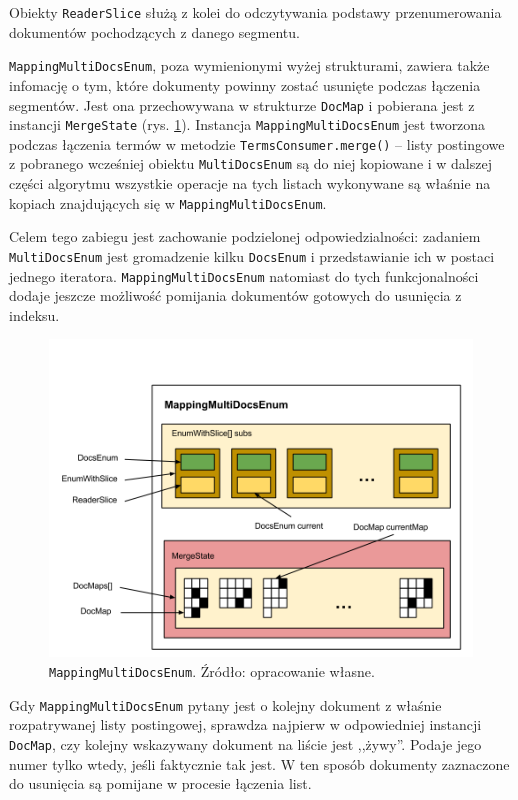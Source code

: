 Obiekty \texttt{ReaderSlice} służą z kolei do odczytywania podstawy przenumerowania dokumentów pochodzących z danego segmentu.

\texttt{MappingMultiDocsEnum}, poza wymienionymi wyżej strukturami, zawiera także infomację o tym, które dokumenty powinny zostać usunięte podczas łączenia segmentów. Jest ona przechowywana w strukturze \texttt{DocMap} i pobierana jest z instancji \texttt{MergeState} (rys. \ref{fig:mappingMultiDocsEnum}). Instancja \texttt{MappingMultiDocsEnum} jest tworzona podczas łączenia termów w metodzie \texttt{TermsConsumer.merge()} -- listy postingowe z pobranego wcześniej obiektu \texttt{MultiDocsEnum} są do niej kopiowane i w dalszej części algorytmu wszystkie operacje na tych listach wykonywane są właśnie na kopiach znajdujących się w \texttt{MappingMultiDocsEnum}. 

Celem tego zabiegu jest zachowanie podzielonej odpowiedzialności: zadaniem \texttt{MultiDocsEnum} jest gromadzenie kilku \texttt{DocsEnum} i przedstawianie ich w postaci jednego iteratora. \texttt{MappingMultiDocsEnum} natomiast do tych funkcjonalności dodaje jeszcze możliwość pomijania dokumentów gotowych do usunięcia z indeksu. 

\begin{figure}[here]
 \includegraphics[scale=0.4]{pictures/MappingMultiDocsEnum.png}
 \caption{\texttt{MappingMultiDocsEnum}. Źródło: opracowanie własne. \label{fig:mappingMultiDocsEnum}}
\end{figure}

Gdy \texttt{MappingMultiDocsEnum} pytany jest o kolejny dokument z właśnie rozpatrywanej listy postingowej, sprawdza najpierw w odpowiedniej instancji \texttt{DocMap}, czy kolejny wskazywany dokument na liście jest ,,żywy''. Podaje jego numer tylko wtedy, jeśli faktycznie tak jest. W ten sposób dokumenty zaznaczone do usunięcia są pomijane w procesie łączenia list. 

